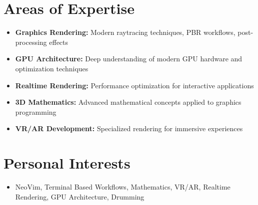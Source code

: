 \documentclass[letterpaper,11pt]{article}
\newcommand{\resumeItem}[1]{
  \item\small{
    {#1 \vspace{-2pt}}
  }
}
\newcommand{\resumeSubItem}[1]{\resumeItem{#1}\vspace{-4pt}}
\newcommand{\resumeSubHeadingListStart}{\begin{itemize}[leftmargin=0.15in, label={}]}
\newcommand{\resumeSubHeadingListEnd}{\end{itemize}}
\begin{document}
\section{Areas of Expertise}
\resumeSubHeadingListStart
\resumeSubItem{\textbf{Graphics Rendering:} Modern raytracing techniques, PBR workflows, post-processing effects}
\resumeSubItem{\textbf{GPU Architecture:} Deep understanding of modern GPU hardware and optimization techniques}
\resumeSubItem{\textbf{Realtime Rendering:} Performance optimization for interactive applications}
\resumeSubItem{\textbf{3D Mathematics:} Advanced mathematical concepts applied to graphics programming}
\resumeSubItem{\textbf{VR/AR Development:} Specialized rendering for immersive experiences}
\resumeSubHeadingListEnd

\section{Personal Interests}
\resumeSubHeadingListStart
\resumeSubItem{NeoVim, Terminal Based Workflows, Mathematics, VR/AR, Realtime Rendering, GPU Architecture, Drumming}
\resumeSubHeadingListEnd
\end{document}
